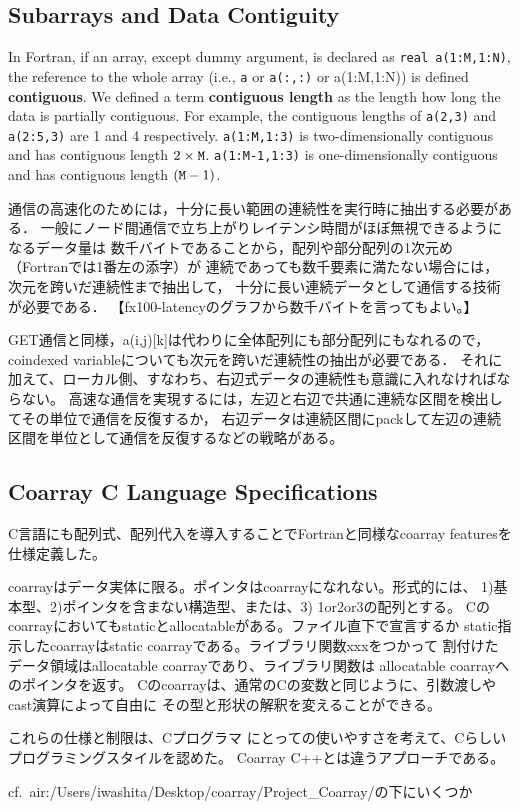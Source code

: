 \subsection{Subarrays and Data Contiguity}\label{sec:spec-contig}

In Fortran, if an array, except dummy argument, is declared as {\tt real a(1:M,1:N)}, 
the reference to the whole array (i.e., {\tt a} or {\tt a(:,:)} or {a(1:M,1:N)})
is defined {\bf contiguous}. 
We defined a term {\bf contiguous length} as the length how long the data is partially
contiguous. For example, the contiguous lengths of {\tt a(2,3)} and {\tt a(2:5,3)} are
1 and 4 respectively.  {\tt a(1:M,1:3)} is two-dimensionally contiguous and has 
contiguous length $2 \times {\tt M}$.
{\tt a(1:M-1,1:3)} is one-dimensionally contiguous and has 
contiguous length $({\tt M} - 1)$.


\requirement
通信の高速化のためには，十分に長い範囲の連続性を実行時に抽出する必要がある．
一般にノード間通信で立ち上がりレイテンシ時間がほぼ無視できるようになるデータ量は
数千バイトであることから，配列や部分配列の1次元め（Fortranでは1番左の添字）が
連続であっても数千要素に満たない場合には，次元を跨いだ連続性まで抽出して，
十分に長い連続データとして通信する技術が必要である．
【fx100-latencyのグラフから数千バイトを言ってもよい。】

GET通信と同様，a(i,j)[k]は代わりに全体配列にも部分配列にもなれるので，
coindexed variableについても次元を跨いだ連続性の抽出が必要である．
それに加えて、ローカル側、すなわち、右辺式データの連続性も意識に入れなければならない。
高速な通信を実現するには，左辺と右辺で共通に連続な区間を検出してその単位で通信を反復するか，
右辺データは連続区間にpackして左辺の連続区間を単位として通信を反復するなどの戦略がある。



\subsection{Coarray C Language Specifications}\label{sec:spec-c}

C言語にも配列式、配列代入を導入することでFortranと同様なcoarray featuresを仕様定義した。

coarrayはデータ実体に限る。ポインタはcoarrayになれない。形式的には、
1)基本型、2)ポインタを含まない構造型、または、3) 1or2or3の配列とする。
Cのcoarrayにおいてもstaticとallocatableがある。ファイル直下で宣言するか
static指示したcoarrayはstatic coarrayである。ライブラリ関数xxxをつかって
割付けたデータ領域はallocatable coarrayであり、ライブラリ関数は
allocatable coarrayへのポインタを返す。
Cのcoarrayは、通常のCの変数と同じように、引数渡しやcast演算によって自由に
その型と形状の解釈を変えることができる。

これらの仕様と制限は、Cプログラマ
にとっての使いやすさを考えて、Cらしいプログラミングスタイルを認めた。
Coarray C++とは違うアプローチである。

cf.\ air:/Users/iwashita/Desktop/coarray/Project\_Coarray/の下にいくつか
